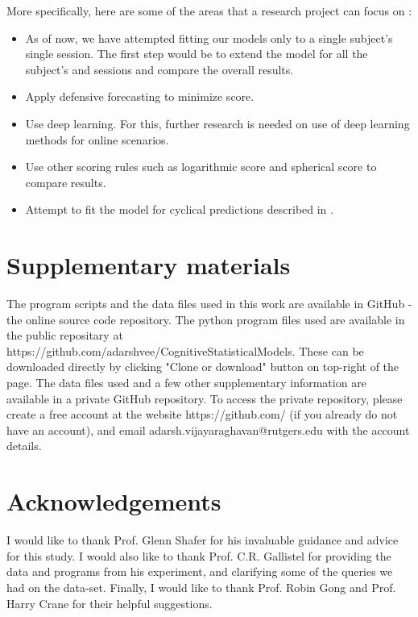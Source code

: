 \documentclass{article}
\begin{document}
More specifically, here are some of the areas that a research project can focus on :
\begin{itemize}
\item As of now, we have attempted fitting our models only to a single subject's single session. The first step would be to extend the model for all the subject's and sessions and compare the overall results.
\item Apply defensive forecasting to minimize score.
\item Use deep learning. For this, further research is needed on use of deep learning methods for online scenarios.
\item Use other scoring rules such as logarithmic score and spherical score to compare results.
\item Attempt to fit the model for cyclical predictions described in \cite{gallistel2014perception}.
\end{itemize}

\section{Supplementary materials}
The program scripts and the data files used in this work are available in GitHub - the online source code repository. The python program files used are available in the public repositary at https://github.com/adarshvee/CognitiveStatisticalModels. These can be downloaded directly by clicking "Clone or download" button on top-right of the page. The data files used and a few other supplementary information are available in a private GitHub repository. To access the private repository, please create a free account at the website https://github.com/ (if you already do not have an account), and email adarsh.vijayaraghavan@rutgers.edu with the account details. 

\section{Acknowledgements}
I would like to thank Prof. Glenn Shafer for his invaluable guidance and advice for this study. I would also like to thank Prof. C.R. Gallistel for providing the data and programs from his experiment, and clarifying some of the queries we had on the data-set. Finally, I would like to thank Prof. Robin Gong and Prof. Harry Crane for their helpful suggestions.




\newpage
\appendix
\end{document}

